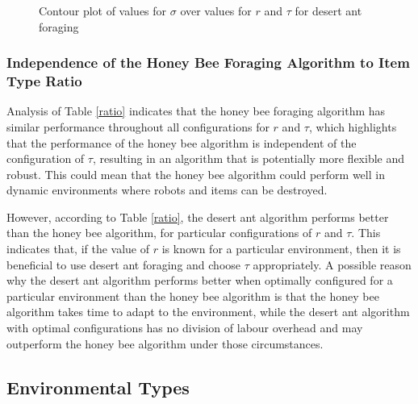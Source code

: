 \begin{figure}[!htb]
\centering
\resizebox{0.8\textwidth}{!}{}
\caption{Contour plot of values for $\sigma$ over values for $r$ and $\tau$ for desert ant foraging}
\label{desertantplot}
\end{figure}


%


\subsubsection{Independence of the Honey Bee Foraging Algorithm to Item Type Ratio}
\label{Adaptability}

Analysis of Table \ref{ratio} indicates that the honey bee foraging algorithm has similar performance throughout all configurations for $r$ and $\tau$, which highlights that the performance of the honey bee algorithm is independent of the configuration of $\tau$, resulting in an algorithm that is potentially more flexible and robust. This could mean that the honey bee algorithm could perform well in dynamic environments where robots and items can be destroyed.

However, according to Table \ref{ratio}, the desert ant algorithm performs better than the honey bee algorithm, for particular configurations of $r$ and $\tau$. This indicates that, if the value of $r$ is known for a particular environment, then it is beneficial to use desert ant foraging and choose $\tau$ appropriately. A possible reason why the desert ant algorithm performs better when optimally configured for a particular environment than the honey bee algorithm is that the honey bee algorithm takes time to adapt to the environment, while the desert ant algorithm with optimal configurations has no division of labour overhead and may outperform the honey bee algorithm under those circumstances.

\subsection{Environmental Types}
\label{results:environmentaltypes}


